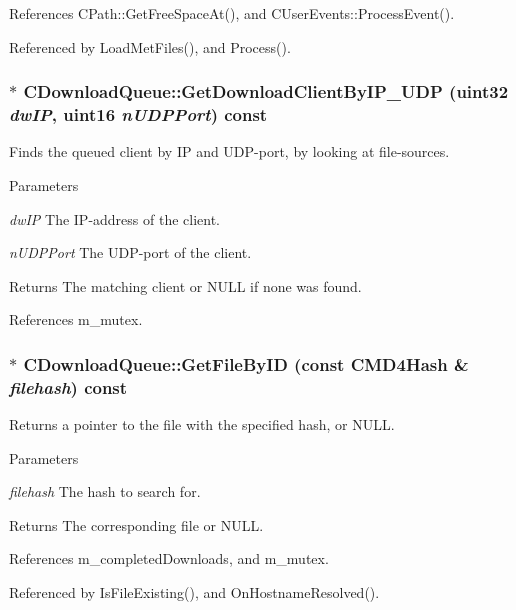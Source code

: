 References CPath::GetFreeSpaceAt(), and CUserEvents::ProcessEvent().

Referenced by LoadMetFiles(), and Process().
\subsubsection[{GetDownloadClientByIP\_\-UDP}]{ $\ast$ CDownloadQueue::GetDownloadClientByIP\_\-UDP (uint32 {\em dwIP}, \/  uint16 {\em nUDPPort}) const}\label{classCDownloadQueue_acb08ffb35ca10a5789a988085ee574c9}


Finds the queued client by IP and UDP-\/port, by looking at file-\/sources. 
\begin{DoxyParams}{Parameters}
\item[{\em dwIP}]The IP-\/address of the client. \item[{\em nUDPPort}]The UDP-\/port of the client. \end{DoxyParams}
\begin{DoxyReturn}{Returns}
The matching client or NULL if none was found. 
\end{DoxyReturn}


References m\_\-mutex.
\subsubsection[{GetFileByID}]{ $\ast$ CDownloadQueue::GetFileByID (const {\bf CMD4Hash} \& {\em filehash}) const}\label{classCDownloadQueue_a3613b7e4b35a207a2aa7042e34f5c9f4}


Returns a pointer to the file with the specified hash, or NULL. 
\begin{DoxyParams}{Parameters}
\item[{\em filehash}]The hash to search for. \end{DoxyParams}
\begin{DoxyReturn}{Returns}
The corresponding file or NULL. 
\end{DoxyReturn}


References m\_\-completedDownloads, and m\_\-mutex.

Referenced by IsFileExisting(), and OnHostnameResolved().
